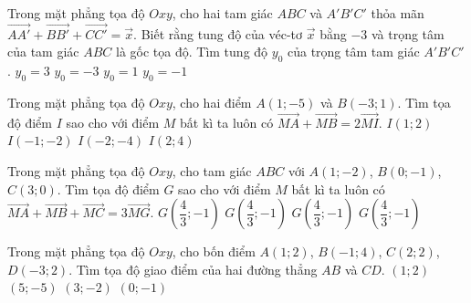 \begin{ex}%
	Trong mặt phẳng tọa độ $Oxy$, cho hai tam giác $ABC$ và $A'B'C'$ thỏa mãn $\vec{AA'}+\vec{BB'}+\vec{CC'}=\vec{x}.$ Biết rằng tung độ của véc-tơ $\vec{x}$ bằng $-3$ và trọng tâm của tam giác $ABC$ là gốc tọa độ. Tìm tung độ $y_0$ của trọng tâm tam giác $A'B'C'$. 
	\choice
	{$y_0=3$}
	{$y_0=-3$}
	{ $y_0=1$}
	{\True $y_0=-1$}
\end{ex}

\begin{ex}%
	Trong mặt phẳng tọa độ $Oxy$, cho hai điểm $A(1;-5)$ và $B(-3;1)$. Tìm tọa độ điểm $I$ sao cho với điểm $M$ bất kì ta luôn có $\vec{MA}+\vec{MB}=2\vec{MI}$.
	\choice
	{$I(1;2)$}
	{\True $I(-1;-2)$}
	{$I(-2;-4)$}
	{$I(2;4)$}
\end{ex}

\begin{ex}%
	Trong mặt phẳng tọa độ $Oxy$, cho tam giác $ABC$ với $A(1;-2)$, $B(0;-1)$, $C(3;0)$. Tìm tọa độ điểm $G$ sao cho với điểm $M$ bất kì ta luôn có $\vec{MA}+\vec{MB}+\vec{MC}=3\vec{MG}$.
	\choice
	{$G\left(\dfrac{4}{3};-1\right)$} 
	{$G\left(\dfrac{4}{3};-1\right)$}
	{\True $G\left(\dfrac{4}{3};-1\right)$}
	{$G\left(\dfrac{4}{3};-1\right)$}
\end{ex}

\begin{ex}%
	Trong mặt phẳng tọa độ $Oxy$, cho bốn điểm $A(1;2)$, $B(-1;4)$, $C(2;2)$, $D(-3;2)$. Tìm tọa độ giao điểm của hai đường thẳng $AB$ và $CD$.
	\choice
	{\True $(1;2)$}
	{$(5;-5)$}
	{$(3;-2)$}
	{$(0;-1)$}
\end{ex}

